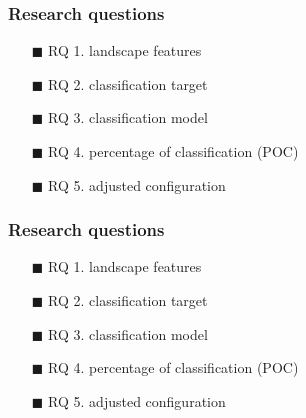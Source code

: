 

\begin{frame}
	\frametitle{Research questions}
	
	\begin{itemize}\setlength{\itemsep}{10pt}
		\item[$\blacksquare$] RQ 1. landscape features
		\item[\textcolor{hni-gray}{$\blacksquare$}] \textcolor{hni-gray}{RQ 2. classification target}
		\item[\textcolor{hni-gray}{$\blacksquare$}] \textcolor{hni-gray}{RQ 3. classification model}
		\item[\textcolor{hni-gray}{$\blacksquare$}] \textcolor{hni-gray}{RQ 4. percentage of classification (POC)}
		\item[\textcolor{hni-gray}{$\blacksquare$}] \textcolor{hni-gray}{RQ 5. adjusted configuration}
	\end{itemize}
	
\end{frame}


\begin{frame}
	\frametitle{Research questions}
	
	\begin{itemize}\setlength{\itemsep}{10pt}
		\item[\textcolor{hni-gray}{$\blacksquare$}] \textcolor{hni-gray}{RQ 1. landscape features}
		\item[$\blacksquare$] RQ 2. classification target
		\item[\textcolor{hni-gray}{$\blacksquare$}] \textcolor{hni-gray}{RQ 3. classification model}
		\item[\textcolor{hni-gray}{$\blacksquare$}] \textcolor{hni-gray}{RQ 4. percentage of classification (POC)}
		\item[\textcolor{hni-gray}{$\blacksquare$}] \textcolor{hni-gray}{RQ 5. adjusted configuration}
	\end{itemize}
	
\end{frame}



